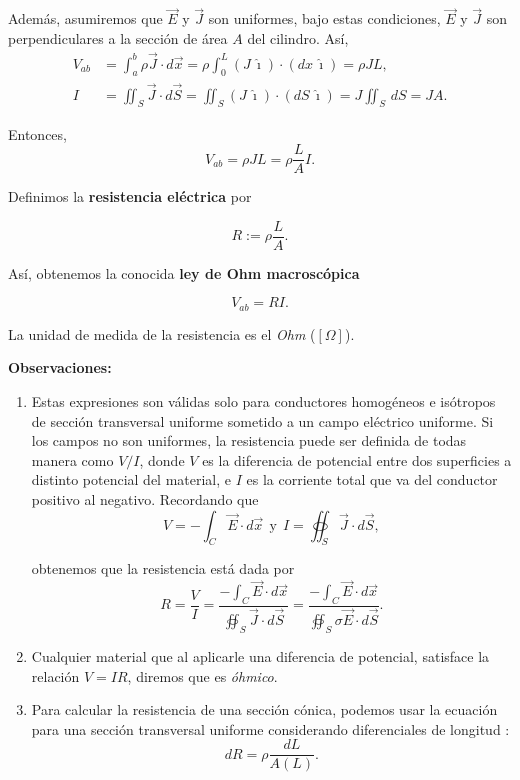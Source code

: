 Además, asumiremos que $\Vec{E}$ y $\Vec{J}$ son uniformes, bajo estas condiciones, $\Vec{E}$ y $\Vec{J}$ son perpendiculares a la sección de área $A$ del cilindro. Así,
    \begin{align*}
        V_{ab} &= \int_a^b \rho \vec{J} \cdot d\vec{x} = \rho \int_0^L (J \,\hat{\imath})\cdot (dx \,\hat{\imath}) = \rho J L, \\
        I&= \iint_S \vec{J} \cdot d\vec{S} = \iint_S (J\,\hat{\imath}) \cdot (dS \,\hat{\imath}) = J \iint_S \,dS = JA.
    \end{align*}

Entonces,
$$V_{ab} = \rho JL = \rho \frac{L}{A} I.$$

Definimos la \textbf{resistencia eléctrica} por
\begin{shaded}
    $$R := \rho \frac{L}{A}.$$
\end{shaded}

Así, obtenemos la conocida \textbf{ley de Ohm macroscópica}
\begin{shaded}
    $$V_{ab} = RI.$$
\end{shaded}

La unidad de medida de la resistencia es el \textit{Ohm} ($[\Omega]$).

\textbf{Observaciones:}

\begin{enumerate}
\item  Estas expresiones son válidas solo para conductores homogéneos e isótropos de sección transversal uniforme sometido a un campo eléctrico uniforme. Si los campos no son uniformes, la resistencia puede ser definida de todas manera como $V/I$, donde $V$ es la diferencia de potencial entre dos superficies a distinto potencial del material, e $I$ es la corriente total que va del conductor positivo al negativo. Recordando que
$$V = - \int_{C} \Vec{E} \cdot d\Vec{x} ~~\text{y}~~ I = \oiint_S \Vec{J} \cdot d\Vec{S},$$

obtenemos que la resistencia está dada por
$$R = \frac{V}{I} = \frac{- \int_{C} \Vec{E} \cdot d\Vec{x}}{\oiint_S \Vec{J} \cdot d\Vec{S}} = \frac{- \int_{C} \Vec{E} \cdot d\Vec{x}}{\oiint_S \sigma \Vec{E} \cdot  d\Vec{S}}.$$

\item Cualquier material que al aplicarle una diferencia de potencial, satisface la relación $V = IR$, diremos que es \textit{óhmico}.

\item Para calcular la resistencia de una sección cónica, podemos usar la ecuación para una sección transversal uniforme considerando diferenciales de longitud :
$$dR = \rho \frac{dL}{A(L)}.$$
\end{enumerate}

